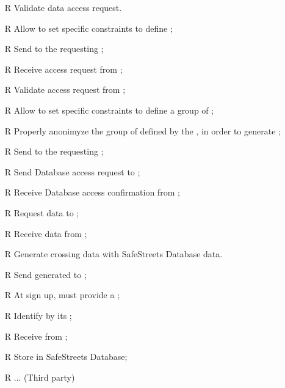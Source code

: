 \documentclass[../../../rasd.tex]{subfiles}
\begin{document}
\begin{itemize}
	\item[R\subs{17}]Validate  data access request.
	\item[R\subs{18}]Allow  to set specific constraints to define ;
	\item[R\subs{19}]Send  to the requesting ;
	\item[R\subs{20}]Receive  access request from ;
	\item[R\subs{21}]Validate  access request from ;
	\item[R\subs{22}]Allow  to set specific constraints to define a group of ;
	\item[R\subs{23}]Properly anonimyze the group of  defined by the , in order to generate ;
	\item[R\subs{24}]Send  to the requesting ;
	\item[R\subs{25}]Send  Database access request to ; 
	\item[R\subs{26}]Receive  Database access confirmation from ;
	\item[R\subs{27}]Request  data to ;
	\item[R\subs{28}]Receive  data from ;
	\item[R\subs{29}]Generate  crossing   data with SafeStreets Database data.
	\item[R\subs{30}]Send generated  to ;
	\item[R\subs{31}]At sign up,  must provide a ;
	\item[R\subs{32}]Identify  by its ;
	\item[R\subs{33}]Receive  from ;
	\item[R\subs{34}]Store  in SafeStreets Database;
	\item[R\subs{}]... (Third party)
\end{itemize}
\end{document}
